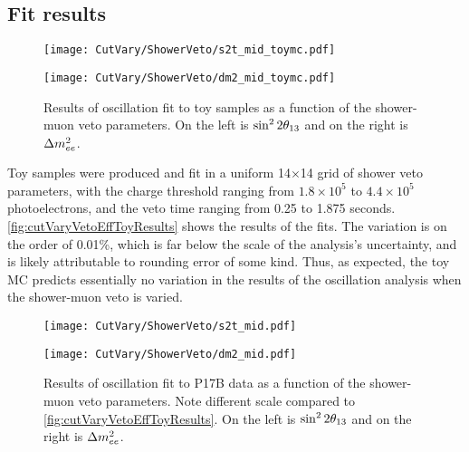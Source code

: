 \documentclass[../thesis.tex]{subfiles}
\begin{document}
\subsection{Fit results}%
\label{sec:cutVaryMuVetoDataResults}

\begin{figure}[ht]
  \begin{minipage}{0.5\linewidth}%
    \texttt{[image: CutVary/ShowerVeto/s2t\_mid\_toymc.pdf]}%
  \end{minipage}%
  \begin{minipage}{0.5\linewidth}%
    \texttt{[image: CutVary/ShowerVeto/dm2\_mid\_toymc.pdf]}%
  \end{minipage}%
  \caption{Results of oscillation fit to toy samples as a function of the shower-muon veto parameters. On the left is $\sin^2 2\theta_{13}$ and on the right is $\Delta m^2_{ee}$. \marknom}
  \label{fig:cutVaryVetoEffToyResults}
\end{figure}

Toy samples were produced and fit in a uniform 14$\times$14 grid of shower veto parameters, with the charge threshold ranging from $1.8\times10^5$ to $4.4\times10^5$ photoelectrons, and the veto time ranging from 0.25 to 1.875 seconds. \autoref{fig:cutVaryVetoEffToyResults} shows the results of the fits. The variation is on the order of 0.01\%, which is far below the scale of the analysis's uncertainty, and is likely attributable to rounding error of some kind. Thus, as expected, the toy MC predicts essentially no variation in the results of the oscillation analysis when the shower-muon veto is varied.

\begin{figure}[ht]
  \begin{minipage}{0.5\linewidth}%
    \texttt{[image: CutVary/ShowerVeto/s2t\_mid.pdf]}%
  \end{minipage}%
  \begin{minipage}{0.5\linewidth}%
    \texttt{[image: CutVary/ShowerVeto/dm2\_mid.pdf]}%
  \end{minipage}%
  \caption{Results of oscillation fit to P17B data as a function of the shower-muon veto parameters. Note different scale compared to \autoref{fig:cutVaryVetoEffToyResults}. On the left is $\sin^2 2\theta_{13}$ and on the right is $\Delta m^2_{ee}$. \marknom}
  \label{fig:cutVaryVetoEffDataResults}
\end{figure}
\end{document}
